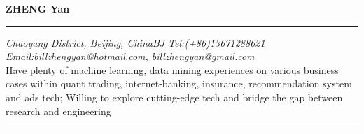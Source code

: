 \documentclass[a4paper,8pt,oneside]{scrartcl}
\makeatletter
\newcommand{\name}{ZHENG Yan}
\newcommand{\addrown}{Chaoyang District, Beijing, China}
\newcommand{\bjphone}{BJ Tel:(+86)13671288621}
\newcommand{\email}{Email:billzhengyan@hotmail.com, billzhengyan@gmail.com}
\newcommand{\Region}{Hong Kong, China}
\newcommand{\bigname}[1]{
    \begin{center}\fontfamily{phv}\selectfont\LARGE\bfseries#1\end{center}
}
\makeatother
\begin{document}
 \selectfont

\bigname{\name}

\vspace{-6pt} \rule{\textwidth}{1pt}

\vspace{-1pt} {\small\itshape \addrown \hfill \bjphone\\
       \email %
\\[5pt]}
Have plenty of machine learning, data mining experiences on various business cases within quant trading, internet-banking, insurance, recommendation system and ads tech; Willing to explore cutting-edge tech and bridge the gap between research and engineering
\\[-5mm]

\rule{\textwidth}{1pt}

\vspace{6pt}
\end{document}
